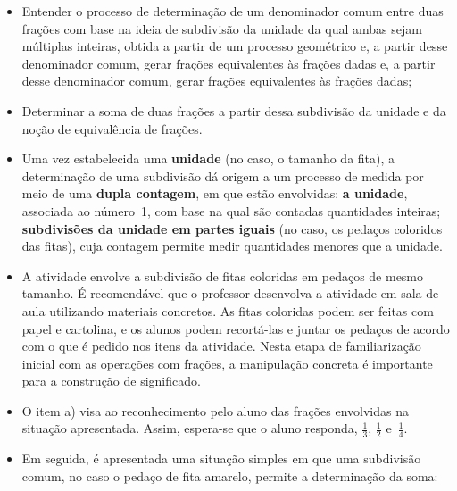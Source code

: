 \begin{multicols}{2}
\begin{objetivos}[label=chap5-ativ2]{}{}
\begin{itemize} %
    \item       Entender o processo de determinação de um denominador comum entre duas frações com base na ideia de subdivisão da unidade da qual ambas sejam múltiplas inteiras, obtida a partir de um processo geométrico e, a partir desse denominador comum, gerar frações equivalentes às frações dadas e, a partir desse denominador comum, gerar frações equivalentes às frações dadas;
    \item       Determinar a soma de duas frações a partir dessa subdivisão da unidade e da noção de equivalência de frações.
\end{itemize} %
\end{objetivos}
\vspace*{\fill}


\begin{orientacoes}{}{}

\begin{itemize} %
    \item       Uma vez estabelecida uma       {\bf unidade}       (no caso, o tamanho da fita), a determinação de uma subdivisão dá origem a um processo de medida por meio de uma       {\bf dupla contagem}, em que estão envolvidas:       {\bf a unidade}, associada ao número~1, com base na qual são contadas quantidades inteiras;       {\bf subdivisões da unidade em partes iguais}       (no caso, os pedaços coloridos das fitas), cuja contagem permite medir quantidades menores que a unidade.
    \item       A atividade envolve a subdivisão de fitas coloridas em pedaços de mesmo tamanho. É recomendável que o professor desenvolva a atividade em sala de aula utilizando materiais concretos. As fitas coloridas podem ser feitas com papel e cartolina, e os alunos podem recortá-las e juntar os pedaços de acordo com o que é pedido nos itens da atividade. Nesta etapa de familiarização inicial com as operações com frações, a manipulação concreta é importante para a construção de significado.
    \item       O item a) visa ao reconhecimento pelo aluno das frações envolvidas na situação apresentada. Assim, espera-se que o aluno responda,       $\frac{1}{3}$,       $\frac{1}{2}$       e~$\frac{1}{4}$.
    \item       Em seguida, é apresentada uma situação simples em que uma subdivisão comum, no caso o pedaço de fita amarelo, permite a determinação da soma:
\end{itemize} %


\end{orientacoes}
\end{multicols}
